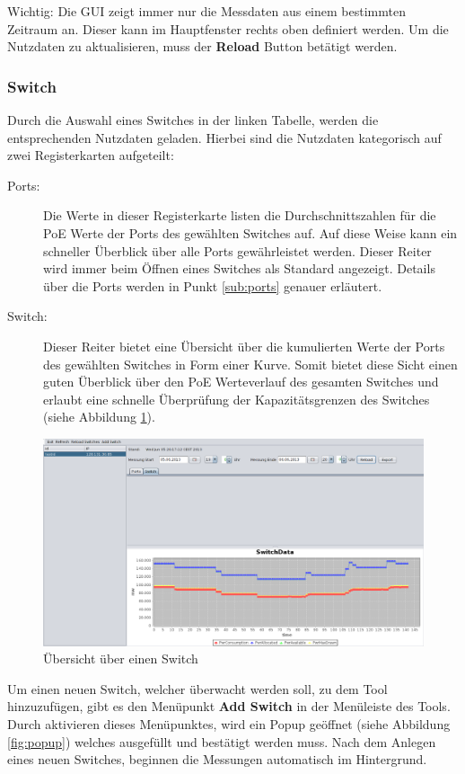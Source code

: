 Wichtig: Die GUI zeigt immer nur die Messdaten aus einem bestimmten Zeitraum an. Dieser kann im Hauptfenster rechts oben definiert werden. Um die Nutzdaten zu aktualisieren, muss der \textbf{Reload} Button betätigt werden.

\subsubsection{Switch}
Durch die Auswahl eines Switches in der linken Tabelle, werden die entsprechenden Nutzdaten geladen. Hierbei sind die Nutzdaten kategorisch auf zwei Registerkarten aufgeteilt:
\begin{description}
 \item[Ports:] Die Werte in dieser Registerkarte listen die Durchschnittszahlen für die PoE Werte der Ports des gewählten Switches auf. Auf diese Weise kann ein schneller Überblick über alle Ports gewährleistet werden. Dieser Reiter wird immer beim Öffnen eines Switches als Standard angezeigt. Details über die Ports werden in Punkt \ref{sub:ports} genauer erläutert.
 \item[Switch:] Dieser Reiter bietet eine Übersicht über die kumulierten Werte der Ports des gewählten Switches in Form einer Kurve. Somit bietet diese Sicht einen guten Überblick über den PoE Werteverlauf des gesamten Switches und erlaubt eine schnelle Überprüfung der Kapazitätsgrenzen des Switches (siehe Abbildung \ref{fig:overview-switch}).
\end{description}

\begin{figure}[h]
    \centering
    \leavevmode
    \includegraphics[width=1.0\linewidth]{figures/switchDetails}
    \caption{Übersicht über einen Switch}
    \label{fig:overview-switch}
\end{figure}

Um einen neuen Switch, welcher überwacht werden soll, zu dem Tool hinzuzufügen, gibt es den Menüpunkt \textbf{Add Switch} in der Menüleiste des Tools. Durch aktivieren dieses Menüpunktes, wird ein Popup geöffnet (siehe Abbildung \ref{fig:popup}) welches ausgefüllt und bestätigt werden muss. Nach dem Anlegen eines neuen Switches, beginnen die Messungen automatisch im Hintergrund.

